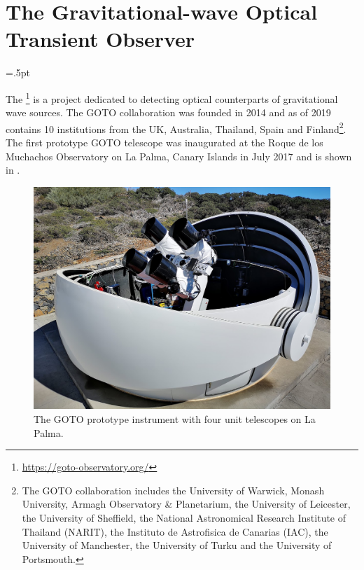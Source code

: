 \section{The Gravitational-wave Optical Transient Observer}
\hfuzz=.5pt %
\label{sec:goto}
\begin{colsection}


\begin{colsection}

The \footnote{\url{https://goto-observatory.org/}} is a project dedicated to detecting optical counterparts of gravitational wave sources. The GOTO collaboration was founded in 2014 and as of 2019 contains 10 institutions from the UK, Australia, Thailand, Spain and Finland\footnote{The GOTO collaboration includes the University of Warwick, Monash University, Armagh Observatory \& Planetarium, the University of Leicester, the University of Sheffield, the National Astronomical Research Institute of Thailand (NARIT), the Instituto de Astrofisica de Canarias (IAC), the University of Manchester, the University of Turku and the University of Portsmouth.}. The first prototype GOTO telescope was inaugurated at the Roque de los Muchachos Observatory on La Palma, Canary Islands in July 2017 and is shown in .

\begin{figure}[p]
    \begin{center}
        \includegraphics[width=0.9\linewidth]{images/goto_photo.jpg}
    \end{center}
    \caption[The GOTO prototype instrument]{
        The GOTO prototype instrument with four unit telescopes on La Palma.
    }\label{fig:goto_photo}
\end{figure}


\end{colsection}
\end{colsection}
